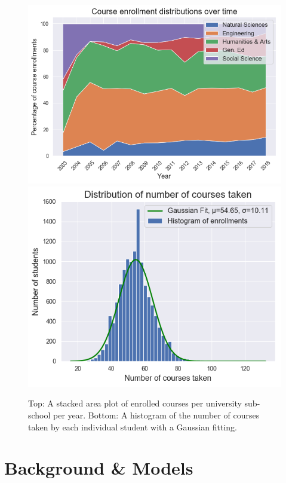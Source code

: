 \documentclass{edm_template}
\begin{document}
\begin{figure}
    \centering
    \includegraphics[scale=0.48]{figures/dists_over_time.png}
    \includegraphics[scale=0.51]{figures/enrollment_dist.png}
    \caption{Top: A stacked area plot of enrolled courses per university sub-school per year. Bottom: A histogram of the number of courses taken by each individual student with a Gaussian fitting.}
    \label{fig:data_statistics}
\end{figure}

\section{Background \& Models}
\label{section:background}
\end{document}
